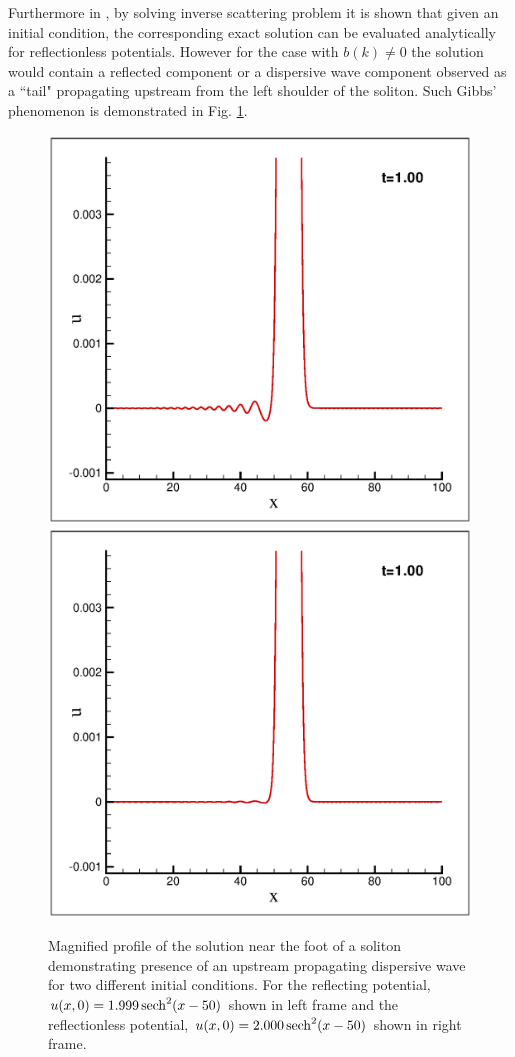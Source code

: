 Furthermore in \cite{Gardner1967}, by solving inverse scattering problem it is shown that given an initial condition, the corresponding exact solution 
can be evaluated analytically for reflectionless potentials. However for the case with $b(k)\neq 0$ the solution would contain a reflected component or 
a dispersive wave component observed as a ``tail" propagating upstream from the left shoulder of the soliton. Such Gibbs' phenomenon is demonstrated in Fig. \ref{fig:reflect}.

\begin{figure}[h!]
\centerline{
\includegraphics[width=0.5\linewidth]{Fig_2a}
\includegraphics[width=0.5\linewidth]{Fig_2b}
}
\caption{Magnified profile of the solution near the foot of a soliton demonstrating presence of an upstream propagating dispersive wave for two different initial conditions. For the reflecting potential, $u(x,0)=1.999\operatorname{sech}^2(x-50)$ shown in left frame and the reflectionless potential, $u(x,0)=2.000\operatorname{sech}^2(x-50)$ shown in right frame.}
\label{fig:reflect}
\end{figure}

